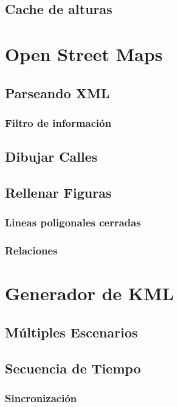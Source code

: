 \subsection*{Cache de alturas}
\section*{Open Street Maps}
\subsection*{Parseando XML}
\subsubsection*{Filtro de información}
\subsection*{Dibujar Calles}
\subsection*{Rellenar Figuras}
\subsubsection*{Lineas poligonales cerradas}
\subsubsection*{Relaciones}
\section*{Generador de KML}
\subsection*{Múltiples Escenarios}
\subsection*{Secuencia de Tiempo}
\subsubsection*{Sincronización}
